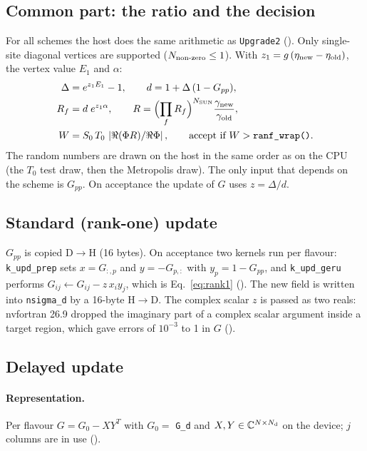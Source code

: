 \subsection{Common part: the ratio and the decision}

For all schemes the host does the same arithmetic as \texttt{Upgrade2} (). Only single-site diagonal vertices are supported ($N_{\rm non\text{-}zero}\le1$). With $z_1=g\,(\eta_{\rm new}-\eta_{\rm old})$, the vertex value $E_1$ and $\alpha$:
\begin{align}
\Delta &= e^{z_1E_1}-1, \qquad d = 1+\Delta\,(1-G_{pp}),\\
R_f &= d\;e^{z_1\alpha},\qquad R = \Bigl(\prod_f R_f\Bigr)^{N_{\rm SUN}}\frac{\gamma_{\rm new}}{\gamma_{\rm old}},\\
W &= S_0\,T_0\,\left|\Re(\Phi R)/\Re\Phi\right|,\qquad\text{accept if } W>\texttt{ranf\_wrap()}.
\end{align}
The random numbers are drawn on the host in the same order as on the CPU (the $T_0$ test draw, then the Metropolis draw). The only input that depends on the scheme is $G_{pp}$. On acceptance the update of $G$ uses $z=\Delta/d$.

\subsection{Standard (rank-one) update}

$G_{pp}$ is copied D$\to$H (16 bytes). On acceptance two kernels run per flavour: \texttt{k\_upd\_prep} sets $x=G_{:,p}$ and $y=-G_{p,:}$ with $y_p=1-G_{pp}$, and \texttt{k\_upd\_geru} performs $G_{ij}\leftarrow G_{ij}-z\,x_iy_j$, which is Eq.~\eqref{eq:rank1} (). The new field is written into \texttt{nsigma\_d} by a 16-byte H$\to$D. The complex scalar $z$ is passed as two reals: nvfortran 26.9 dropped the imaginary part of a complex scalar argument inside a target region, which gave errors of $10^{-3}$ to 1 in $G$ (). %

\subsection{Delayed update}

\paragraph{Representation.} Per flavour $G = G_0 - XY^T$ with $G_0=$ \texttt{G\_d} and $X,Y\in\mathbb{C}^{N\times N_{\rm d}}$ on the device; $j$ columns are in use ().
